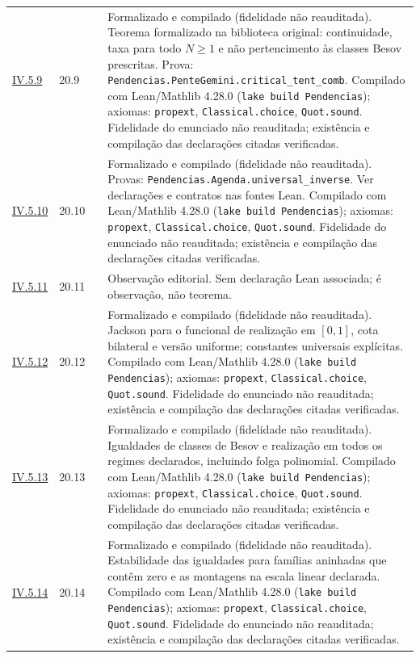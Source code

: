 \documentclass[12pt,a4paper]{article}
\theoremstyle{preciso}
\theoremstyle{definition}
\newcommand{\code}[1]{\nolinkurl{#1}}
\theoremstyle{preciso}
\theoremstyle{preciso}
\theoremstyle{preciso}
\theoremstyle{preciso}
\theoremstyle{definition}
\theoremstyle{preciso}
\theoremstyle{definition}
\theoremstyle{preciso}
\theoremstyle{preciso}
\theoremstyle{definition}
\begin{document}
\begin{singlespace}
\begin{longtable}{@{}p{.11\linewidth}p{.09\linewidth}p{.09\linewidth}p{.59\linewidth}@{}}
\hyperref[map:artigo_3:5.9]{IV.5.9} & 20.9 & \pageref{map:artigo_3:5.9} & Formalizado e compilado (fidelidade não reauditada). Teorema formalizado na biblioteca original: continuidade, taxa para todo $N\ge1$ e não pertencimento às classes Besov prescritas. Prova: \code{Pendencias.PenteGemini.critical_tent_comb}. Compilado com Lean/Mathlib 4.28.0 (\texttt{lake build Pendencias}); axiomas: \texttt{propext}, \texttt{Classical.choice}, \texttt{Quot.sound}. Fidelidade do enunciado não reauditada; existência e compilação das declarações citadas verificadas.\\[4pt]
\hyperref[map:artigo_3:5.10]{IV.5.10} & 20.10 & \pageref{map:artigo_3:5.10} & Formalizado e compilado (fidelidade não reauditada). Provas: \code{Pendencias.Agenda.universal_inverse}. Ver declarações e contratos nas fontes Lean. Compilado com Lean/Mathlib 4.28.0 (\texttt{lake build Pendencias}); axiomas: \texttt{propext}, \texttt{Classical.choice}, \texttt{Quot.sound}. Fidelidade do enunciado não reauditada; existência e compilação das declarações citadas verificadas.\\[4pt]
\hyperref[map:artigo_3:5.11]{IV.5.11} & 20.11 & \pageref{map:artigo_3:5.11} & Observação editorial. Sem declaração Lean associada; é observação, não teorema.\\[4pt]
\hyperref[map:artigo_3:5.12]{IV.5.12} & 20.12 & \pageref{map:artigo_3:5.12} & Formalizado e compilado (fidelidade não reauditada). Jackson para o funcional de realização em $[0,1]$, cota bilateral e versão uniforme; constantes universais explícitas. Compilado com Lean/Mathlib 4.28.0 (\texttt{lake build Pendencias}); axiomas: \texttt{propext}, \texttt{Classical.choice}, \texttt{Quot.sound}. Fidelidade do enunciado não reauditada; existência e compilação das declarações citadas verificadas.\\[4pt]
\hyperref[map:artigo_3:5.13]{IV.5.13} & 20.13 & \pageref{map:artigo_3:5.13} & Formalizado e compilado (fidelidade não reauditada). Igualdades de classes de Besov e realização em todos os regimes declarados, incluindo folga polinomial. Compilado com Lean/Mathlib 4.28.0 (\texttt{lake build Pendencias}); axiomas: \texttt{propext}, \texttt{Classical.choice}, \texttt{Quot.sound}. Fidelidade do enunciado não reauditada; existência e compilação das declarações citadas verificadas.\\[4pt]
\hyperref[map:artigo_3:5.14]{IV.5.14} & 20.14 & \pageref{map:artigo_3:5.14} & Formalizado e compilado (fidelidade não reauditada). Estabilidade das igualdades para famílias aninhadas que contêm zero e as montagens na escala linear declarada. Compilado com Lean/Mathlib 4.28.0 (\texttt{lake build Pendencias}); axiomas: \texttt{propext}, \texttt{Classical.choice}, \texttt{Quot.sound}. Fidelidade do enunciado não reauditada; existência e compilação das declarações citadas verificadas.\\[4pt]
\bottomrule\end{longtable}\normalsize


\end{singlespace}
\end{document}
